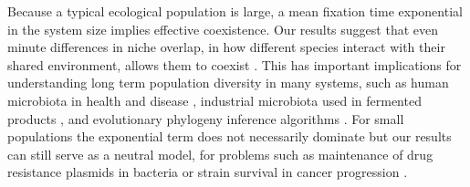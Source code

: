 \documentclass[a4paper,10pt]{article}
\numberwithin{equation}{section} %
\begin{document}
Because a typical ecological population is large, a mean fixation time exponential in the system size implies effective coexistence. 
Our results suggest that even minute differences in niche overlap, in how different species interact with their shared environment, allows them to coexist \cite{Hutchinson1961,May1999}. 
This has important implications for understanding long term population diversity in many  systems, such as human microbiota in health and disease \cite{Coburn2015,Palmer2001,Kinross2011}, industrial microbiota used in fermented products \cite{Wolfe2014}, and evolutionary phylogeny inference algorithms \cite{Rice2004}. %
For small populations the exponential term does not necessarily dominate but our results can still serve as a neutral model, for problems such as maintenance of drug resistance plasmids in bacteria \cite{Gooding-townsend2015} or strain survival in cancer progression \cite{Ashcroft2015}. %
\end{document}
